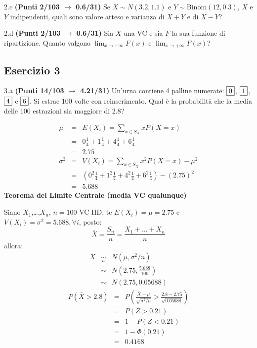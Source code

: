\documentclass[
  11pt,
]{book}
\theoremstyle{mytheoremstyle}
\theoremstyle{mydefstyle}
\newenvironment{sol}
  {
  \begin{tcolorbox}[enhanced,breakable,arc=0.1mm,boxrule=1pt,colback=white,colframe=iblue,
  title=\bf \fontfamily{lmss}\selectfont \hspace{.5 cm} Soluzione,drop fuzzy shadow]

}{
\end{tcolorbox}
  }
\begin{document}
2.c \textbf{(Punti 2/103 \(\rightarrow\) 0.6/31)} Se \(X\sim N(3.2,1.1)\) e \(Y\sim\text{Binom}(12,0.3)\), \(X\) e \(Y\) indipendenti, quali sono valore atteso e varianza di \(X+Y\) e di \(X-Y\)?

2.d \textbf{(Punti 2/103 \(\rightarrow\) 0.6/31)} Sia \(X\) una VC e sia \(F\) la sua funzione di ripartizione. Quanto valgono \(\lim_{x\to-\infty}F(x)\) e \(\lim_{x\to+\infty}F(x)\)?

\subsection{Esercizio 3}\label{esercizio-3-21}

3.a \textbf{(Punti 14/103 \(\rightarrow\) 4.21/31)} Un'urna contiene 4 palline numerate: \(\fbox{0}\), \(\fbox{1}\), \(\fbox{4}\) e \(\fbox{6}\). Si estrae 100 volte con reinserimento. Qual è la probabilità che la media delle 100 estrazioni sia maggiore di 2.8?

\begin{sol}
\begin{eqnarray*} \mu &=& E(X_i) = \sum_{x\in S_X}x P(X=x)\\ 
 &=&  0  \frac { 1 }{ 4 }+ 1  \frac { 1 }{ 4 }+ 4  \frac { 1 }{ 4 }+ 6  \frac { 1 }{ 4 } \\ 
            &=& 2.75 \\ 
 \sigma^2 &=& V(X_i) = \sum_{x\in S_X}x^2 P(X=x)-\mu^2\\ 
 &=&\left(  0  ^2\frac { 1 }{ 4 }+ 1  ^2\frac { 1 }{ 4 }+ 4  ^2\frac { 1 }{ 4 }+ 6  ^2\frac { 1 }{ 4 } \right)-( 2.75 )^2\\ 
            &=& 5.688 
\end{eqnarray*}
\textbf{Teorema del Limite Centrale (media VC qualunque)}

Siano \(X_1\),\ldots,\(X_n\), \(n=100\) VC IID, tc \(E(X_i)=\mu=2.75\) e \(V(X_i)=\sigma^2=5.688,\forall i\), posto:
\[
      \bar X=\frac{S_n}n =\frac{X_1 + ... + X_n}n
      \]
allora:\begin{eqnarray*}
  \bar X & \mathop{\sim}\limits_{a}& N(\mu,\sigma^2/n) \\
     &\sim & N\left(2.75,\frac{5.688}{100}\right) \\
     &\sim & N(2.75,0.05688)
  \end{eqnarray*}\begin{eqnarray*}
      P( \bar X   >   2.8 ) 
        &=& P\left(  \frac { \bar X  -  \mu }{ \sqrt{\sigma^2/n} }  >  \frac { 2.8  -  2.75 }{\sqrt{ 0.05688 }} \right)  \\
                 &=& P\left(  Z   >   0.21 \right) \\    &=& 1-P(Z< 0.21 )\\ 
                 &=&  1-\Phi( 0.21 ) \\ &=&  0.4168 
      \end{eqnarray*}

\end{sol}
\end{document}
